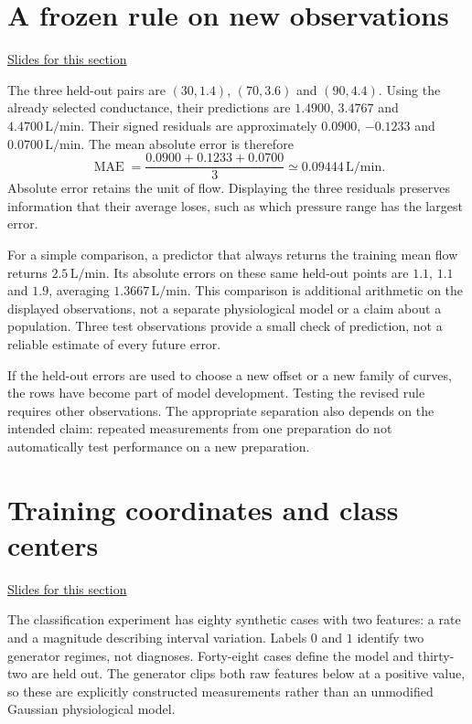 \documentclass[11pt,letterpaper]{article}
\theoremstyle{definition}\newtheorem{definition}{Definition}\newtheorem{example}{Example}
\numberwithin{equation}{section}
\begin{document}
\section{A frozen rule on new observations}
\hypertarget{note-a-frozen-rule-on-new-observations}{}\label{note:a-frozen-rule-on-new-observations}
{\small \href{slides.html\#frame=evaluate-the-frozen-line\&step=1}{Slides for this section}}\par
The three held-out pairs are $(30,1.4)$, $(70,3.6)$ and $(90,4.4)$. Using the already selected conductance, their predictions are $1.4900$, $3.4767$ and $4.4700\,\mathrm{L/min}$. Their signed residuals are approximately $0.0900$, $-0.1233$ and $0.0700\,\mathrm{L/min}$. The mean absolute error is therefore
\begin{equation}\operatorname{MAE}=\frac{0.0900+0.1233+0.0700}{3}\simeq0.09444\,\mathrm{L/min}.
\end{equation}
Absolute error retains the unit of flow. Displaying the three residuals preserves information that their average loses, such as which pressure range has the largest error.

For a simple comparison, a predictor that always returns the training mean flow returns $2.5\,\mathrm{L/min}$. Its absolute errors on these same held-out points are $1.1$, $1.1$ and $1.9$, averaging $1.3667\,\mathrm{L/min}$. This comparison is additional arithmetic on the displayed observations, not a separate physiological model or a claim about a population. Three test observations provide a small check of prediction, not a reliable estimate of every future error.

If the held-out errors are used to choose a new offset or a new family of curves, the rows have become part of model development. Testing the revised rule requires other observations. The appropriate separation also depends on the intended claim: repeated measurements from one preparation do not automatically test performance on a new preparation.
\section{Training coordinates and class centers}
\hypertarget{note-training-coordinates-and-class-centers}{}\label{note:training-coordinates-and-class-centers}
{\small \href{slides.html\#frame=fit-a-coordinate-system-on-training-cases-figure\&step=1}{Slides for this section}}\par
The classification experiment has eighty synthetic cases with two features: a rate and a magnitude describing interval variation. Labels $0$ and $1$ identify two generator regimes, not diagnoses. Forty-eight cases define the model and thirty-two are held out. The generator clips both raw features below at a positive value, so these are explicitly constructed measurements rather than an unmodified Gaussian physiological model.
\end{document}
